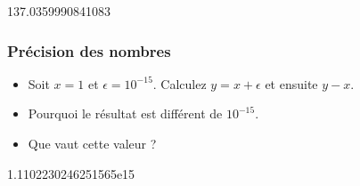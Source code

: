 \documentclass[letterpaper,10pt,english]{sphinxhowto}
\begin{document}
\begin{sphinxVerbatim}[commandchars=\\\{\}]
   

  
  
  
  


  
              
\end{sphinxVerbatim}

\begin{sphinxVerbatim}[commandchars=\\\{\}]
137.0359990841083
\end{sphinxVerbatim}


\subsubsection{Précision des nombres}
\label{\detokenize{cours2_nombres_corr_exercices:precision-des-nombres}}\begin{itemize}
\item {} 
\sphinxAtStartPar
Soit \(x=1\) et \(\epsilon = 10^{-15}\). Calculez \(y=x + \epsilon\) et ensuite \(y - x\).

\item {} 
\sphinxAtStartPar
Pourquoi le résultat est différent de \(10^{-15}\).

\item {} 
\sphinxAtStartPar
Que vaut cette valeur ?

\end{itemize}

\begin{sphinxVerbatim}[commandchars=\\\{\}]
  
  
    
  
\end{sphinxVerbatim}

\begin{sphinxVerbatim}[commandchars=\\\{\}]
1.1102230246251565e\PYGZhy{}15
\end{sphinxVerbatim}
\end{document}
